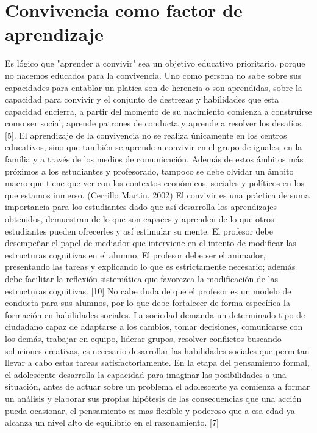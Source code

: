 \documentclass{bmcart}
\begin{document}
\section{Convivencia como factor de aprendizaje}
Es lógico que "aprender a convivir" sea un objetivo educativo prioritario, porque no nacemos educados para la convivencia. Uno como persona no sabe sobre sus capacidades para entablar un platica son de herencia o son aprendidas, sobre la capacidad para convivir y el conjunto de destrezas y habilidades que esta capacidad encierra, a partir del momento de su nacimiento comienza a construirse como ser social, aprende patrones de conducta y aprende a resolver los desafíos. [5].
\newline
\newline
El aprendizaje de la convivencia no se realiza únicamente en los centros educativos, sino que también se aprende a convivir en el grupo de iguales, en la familia y a través de los medios de comunicación. Además de estos ámbitos más próximos a los estudiantes y profesorado, tampoco se debe olvidar un ámbito macro que tiene que ver con los contextos económicos, sociales y políticos en los que estamos inmerso. (Cerrillo Martin, 2002)
\newline
\newline
El convivir es una práctica de suma importancia para los estudiantes dado que así desarrolla los aprendizajes obtenidos, demuestran de lo que son capaces y aprenden de lo que otros estudiantes pueden ofrecerles y así estimular su mente.
\newline
\newline
El profesor debe desempeñar el papel de mediador que interviene en el intento de modificar las estructuras cognitivas en el alumno. El profesor debe ser el animador, presentando las tareas y explicando lo que es estrictamente necesario; además debe facilitar la reflexión sistemática que favorezca la modificación de las estructuras cognitivas. [10]
\newline
\newline
No cabe duda de que el profesor es un modelo de conducta para sus alumnos, por lo que debe fortalecer de forma específica la  formación en habilidades   sociales. La sociedad demanda un determinado tipo de ciudadano capaz de adaptarse a los cambios, tomar decisiones, comunicarse con los demás, trabajar en equipo, liderar grupos, resolver conflictos buscando soluciones creativas, es necesario desarrollar las habilidades sociales que permitan llevar a cabo estas tareas  satisfactoriamente.
\newline
\newline
En la etapa del pensamiento formal, el adolescente desarrolla la capacidad para imaginar las posibilidades a una situación, antes de actuar sobre un problema el adolescente ya comienza a formar un análisis y elaborar sus propias hipótesis de las consecuencias que una acción pueda ocasionar, el pensamiento es mas flexible y poderoso que a esa edad ya alcanza un nivel alto de equilibrio en el razonamiento. [7]
\end{document}
